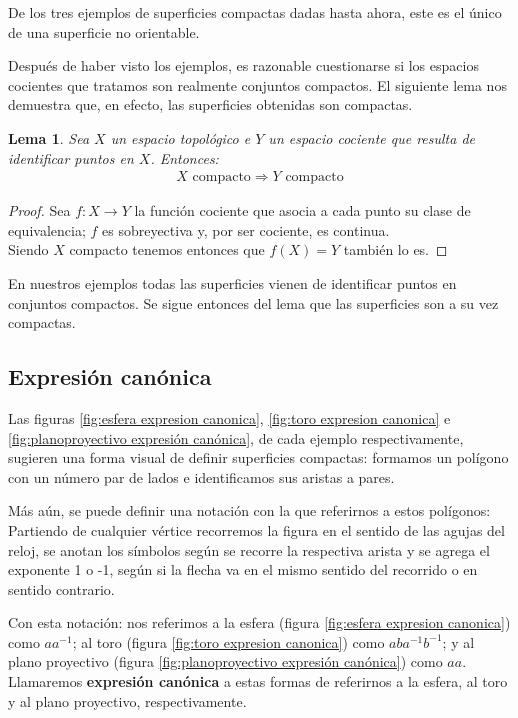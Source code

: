 \documentclass[a4paper,11pt,spanish, twoside, leqno]{tfg-uam}
\newtheorem{lema}[teor]{Lema}
\theoremstyle{definition}
\begin{document}
De los tres ejemplos de superficies compactas dadas hasta ahora, este es el único de una superficie no orientable. 

Después de haber visto los ejemplos, es razonable cuestionarse si los espacios cocientes que tratamos son realmente conjuntos compactos. El siguiente lema nos demuestra que, en efecto, las superficies obtenidas son compactas.

\begin{lema}\label{lema:compacidadDePoligonos}
Sea $X$ un espacio topológico e $Y$  un espacio cociente que resulta de identificar puntos en $X$. Entonces:
\begin{align*}
	\text{$X$ compacto}\Rightarrow\text{$Y$ compacto}
\end{align*}
\end{lema}

\begin{proof}
Sea $f:X\longrightarrow Y$ la función cociente que asocia a cada punto su clase de equivalencia; $f$ es sobreyectiva y, por ser cociente, es continua.\\
Siendo $X$ compacto tenemos entonces que $f(X)=Y$ también lo es.
\end{proof}

En nuestros ejemplos todas las superficies vienen de identificar puntos en conjuntos compactos. Se sigue entonces del lema que las superficies son a su vez compactas.


\subsection{Expresión canónica}
\label{subsec:expcanonica}

Las figuras \ref{fig:esfera expresion canonica}, \ref{fig:toro expresion canonica} e \ref{fig:planoproyectivo expresión canónica}, de cada ejemplo respectivamente, sugieren una forma visual de definir superficies compactas: formamos un polígono con un número par de lados e identificamos sus aristas a pares. 

Más aún, se puede definir una notación con la que referirnos a estos polígonos: \\
Partiendo de cualquier vértice recorremos la figura en el sentido de las agujas del reloj, se anotan los símbolos según se recorre la respectiva arista y se agrega el exponente 1 o -1, según si la flecha va en el mismo sentido del recorrido o en sentido contrario.

Con esta notación: nos referimos  a la esfera (figura \ref{fig:esfera expresion canonica}) como $ aa^{-1} $; al toro (figura \ref{fig:toro expresion canonica})  como $ aba^{-1}b^{-1} $; y al plano proyectivo (figura \ref{fig:planoproyectivo expresión canónica}) como $ aa $. Llamaremos \textbf{expresión canónica} a estas formas de referirnos a la esfera, al toro y al plano proyectivo, respectivamente.
\end{document}
